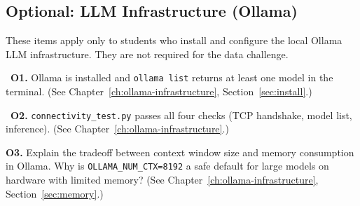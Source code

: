 \begin{Form}
\section{Optional: LLM Infrastructure (Ollama)}
\label{sec:assess-optional}

These items apply only to students who install and configure the
local Ollama LLM infrastructure. They are not required for the data
challenge.

\vs

\noindent\CheckBox[name=o1,width=0.4cm,height=0.4cm]{}~\textbf{O1.}
Ollama is installed and \texttt{ollama list} returns at least one
model in the terminal.
(See Chapter~\ref{ch:ollama-infrastructure},
Section~\ref{sec:install}.)

\vs

\noindent\CheckBox[name=o2,width=0.4cm,height=0.4cm]{}~\textbf{O2.}
\texttt{connectivity\_test.py} passes all four checks (TCP
handshake, model list, inference).
(See Chapter~\ref{ch:ollama-infrastructure}.)

\vs

\noindent\textbf{O3.} Explain the tradeoff between context window
size and memory consumption in Ollama. Why is \texttt{OLLAMA\_NUM\_CTX=8192}
a safe default for large models on hardware with limited memory?
(See Chapter~\ref{ch:ollama-infrastructure},
Section~\ref{sec:memory}.)\\[4pt]
\TextField[name=o3,width=\linewidth,height=3cm,multiline=true,
           bordercolor=black]{}

\end{Form}
